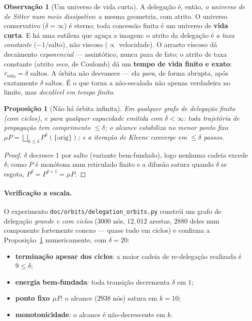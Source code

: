 \documentclass[11pt,a4paper]{article}
\newtheorem{proposition}[theorem]{Proposição}
\theoremstyle{definition}
\newtheorem{remark}[theorem]{Observação}
\newcommand{\dep}{\delta}
\begin{document}
\begin{remark}[Um universo de vida curta]\label{rem:vida}
A delegação é, então, \emph{o universo de de Sitter num meio dissipativo}: a
mesma geometria, com atrito. O universo conservativo ($\dep=\infty$) é eterno;
toda concessão finita é um universo de \textbf{vida curta}. E há uma sutileza
que aguça a imagem: o atrito da delegação é \emph{a taxa constante}
($-1$/salto), não viscoso ($\propto$ velocidade). O arrasto viscoso dá decaimento
\emph{exponencial} --- assintótico, nunca para de fato; o atrito de taxa
constante (atrito \emph{seco}, de Coulomb) dá um \textbf{tempo de vida finito e
exato}: $\tau_{\mathrm{vida}}=\dep$ saltos. A órbita não desvanece --- ela
\emph{para}, de forma abrupta, após exatamente $\dep$ saltos. É o que torna a
não-escalada não apenas verdadeira no limite, mas \emph{decidível em tempo
finito}.
\end{remark}

\begin{proposition}[Não há órbita infinita]\label{prop:orbit}
Em qualquer grafo de delegação \emph{finito} (com ciclos), e para qualquer
capacidade emitida com $\dep<\infty$: toda trajetória de propagação tem
comprimento $\le\dep$; o alcance estabiliza no menor ponto fixo
$\mu P=\bigsqcup_{k\le\dep}P^k(\{\mathrm{orig}\})$; e a iteração de Kleene
converge em $\le\dep$ passos.
\end{proposition}
\begin{proof}
$\dep$ decresce $1$ por salto (variante bem-fundado), logo nenhuma cadeia
excede $\dep$; como $P$ é monótona num reticulado finito e a difusão satura
quando $\dep$ se esgota, $P^{\dep}=P^{\dep+1}=\mu P$.
\end{proof}

\paragraph{Verificação a escala.} O experimento
\texttt{doc/orbits/delegation\_orbits.py} constrói um grafo de delegação
\emph{grande e com ciclos} ($3000$ nós, $12{,}012$ arestas, $2880$ deles num
componente fortemente conexo --- quase tudo em ciclos) e confirma a
Proposição~\ref{prop:orbit} numericamente, com $\dep=20$:
\begin{itemize}[nosep,leftmargin=1.3em]
  \item \textbf{terminação apesar dos ciclos}: a maior cadeia de re-delegação
        realizada é $9\le\dep$;
  \item \textbf{energia bem-fundada}: toda transição decrementa $\dep$ em $1$;
  \item \textbf{ponto fixo $\mu P$}: o alcance ($2938$ nós) satura em $k=10$;
  \item \textbf{monotonicidade}: o alcance é não-decrescente em $k$.
\end{itemize}
\end{document}
